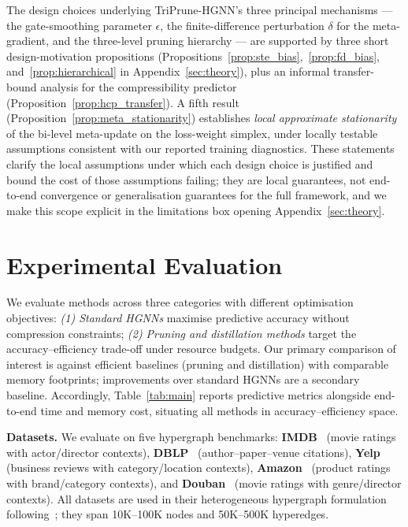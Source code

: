 \documentclass[10pt]{article}
\theoremstyle{plain}
\theoremstyle{definition}
\begin{document}
The design choices underlying TriPrune-HGNN's three principal mechanisms --- the gate-smoothing parameter $\epsilon$, the finite-difference perturbation $\delta$ for the meta-gradient, and the three-level pruning hierarchy --- are supported by three short design-motivation propositions (Propositions~\ref{prop:ste_bias},~\ref{prop:fd_bias}, and~\ref{prop:hierarchical} in Appendix~\ref{sec:theory}), plus an informal transfer-bound analysis for the compressibility predictor (Proposition~\ref{prop:hcp_transfer}). A fifth result (Proposition~\ref{prop:meta_stationarity}) establishes \emph{local approximate stationarity} of the bi-level meta-update on the loss-weight simplex, under locally testable assumptions consistent with our reported training diagnostics. These statements clarify the local assumptions under which each design choice is justified and bound the cost of those assumptions failing; they are local guarantees, not end-to-end convergence or generalisation guarantees for the full framework, and we make this scope explicit in the limitations box opening Appendix~\ref{sec:theory}.

\section{Experimental Evaluation}
\label{sec:experiments}

We evaluate methods across three categories with different optimisation objectives: \emph{(1) Standard HGNNs} maximise predictive accuracy without compression constraints; \emph{(2) Pruning and distillation methods} target the accuracy--efficiency trade-off under resource budgets. Our primary comparison of interest is against efficient baselines (pruning and distillation) with comparable memory footprints; improvements over standard HGNNs are a secondary baseline. Accordingly, Table~\ref{tab:main} reports predictive metrics alongside end-to-end time and memory cost, situating all methods in accuracy--efficiency space.

\textbf{Datasets.} We evaluate on five hypergraph benchmarks:
\textbf{IMDB}~\citep{singh2008relational} (movie ratings with actor/director contexts), \textbf{DBLP}~\citep{tang2008arnetminer} (author--paper--venue citations), \textbf{Yelp}~\citep{asghar2016yelp} (business reviews with category/location contexts), \textbf{Amazon}~\citep{mcauley2015inferring} (product ratings with brand/category contexts), and \textbf{Douban}~\citep{zheng2021disentangling} (movie ratings with genre/director contexts). All datasets are used in their heterogeneous hypergraph formulation following~\citet{kim2024survey}; they span 10K--100K nodes and 50K--500K hyperedges.
\end{document}
